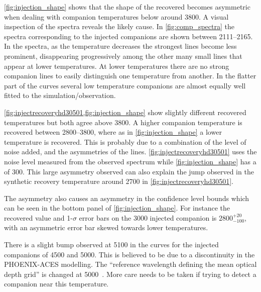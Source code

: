 \cref{fig:injection_shape} shows that the shape of the recovered \textchisquared{} becomes asymmetric when dealing with companion temperatures below around 3800\K{}.
A visual inspection of the spectra reveals the likely cause.
In \cref{fig:comp_spectra} the spectra corresponding to the injected companions are shown between 2111--2165\nm{}.
In the spectra, as the temperature decreases the strongest lines become less prominent, disappearing progressively among the other many small lines that appear at lower temperatures.
At lower temperatures there are no strong companion lines to easily distinguish one temperature from another.
In the flatter part of the \textchisquared{} curves several low temperature companions are almost equally well fitted to the simulation/observation.

\cref{fig:injectrecoveryhd30501,fig:injection_shape} show slightly different recovered temperatures but both agree above 3800\K{}.
A higher companion temperature is recovered between 2800--3800\K{}, where as in \cref{fig:injection_shape} a lower temperature is recovered.
This is probably due to a combination of the level of noise added, and the asymmetries of the \textchisquared{} lines.
\cref{fig:injectrecoveryhd30501} uses the noise level measured from the observed spectrum while \cref{fig:injection_shape} has a \snr{} of 300.
This large asymmetry observed can also explain the jump observed in the synthetic recovery temperature around 2700\K{} in \cref{fig:injectrecoveryhd30501}.

The asymmetry also causes an asymmetry in the confidence level bounds which can be seen in the bottom panel of \cref{fig:injection_shape}.
For instance the recovered value and 1-\(\sigma\) error bars on the 3000\K{} injected companion is \(2800 ^{+20}_{-100}\), with an asymmetric error bar skewed towards lower temperatures.

There is a slight bump observed at 5100\K{} in the \textchisquared{} curves for the injected companions of 4500 and 5000\K{}. This is believed to be due to a discontinuity in the {PHOENIX-ACES} modelling.
The ``reference wavelength defining the mean optical depth grid'' is changed at 5000\K{}~\citep[][Section~2.3]{husser_new_2013}.
More care needs to be taken if trying to detect a companion near this temperature.

